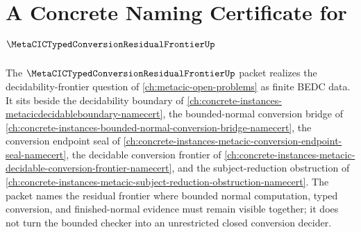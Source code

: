 \chapter{A Concrete Naming Certificate for $\MetaCICTypedConversionResidualFrontierUp$}
\label{ch:concrete-instances-metacic-typed-conversion-residual-frontier-namecert}

The $\MetaCICTypedConversionResidualFrontierUp$ packet realizes the decidability-frontier question of \autoref{ch:metacic-open-problems} as finite BEDC data. It sits beside the decidability boundary of \autoref{ch:concrete-instances-metacicdecidableboundary-namecert}, the bounded-normal conversion bridge of \autoref{ch:concrete-instances-bounded-normal-conversion-bridge-namecert}, the conversion endpoint seal of \autoref{ch:concrete-instances-metacic-conversion-endpoint-seal-namecert}, the decidable conversion frontier of \autoref{ch:concrete-instances-metacic-decidable-conversion-frontier-namecert}, and the subject-reduction obstruction of \autoref{ch:concrete-instances-metacic-subject-reduction-obstruction-namecert}. The packet names the residual frontier where bounded normal computation, typed conversion, and finished-normal evidence must remain visible together; it does not turn the bounded checker into an unrestricted closed conversion decider.

